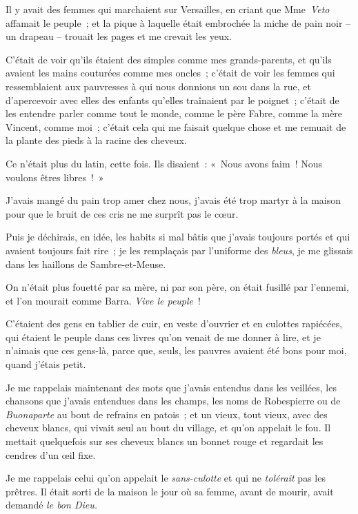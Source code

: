 \documentclass[french,twoside]{book} %
\begin{document}
Il y avait des femmes qui marchaient sur Versailles, en criant que Mme \emph{Veto} affamait le peuple ; et la pique à laquelle était embrochée la miche de pain noir – un drapeau – trouait les pages et me crevait les yeux.\par
C’était de voir qu’ils étaient des simples comme mes grands-parents, et qu’ils avaient les mains couturées comme mes oncles ; c’était de voir les femmes qui ressemblaient aux pauvresses à qui nous donnions un sou dans la rue, et d’apercevoir avec elles des enfants qu’elles traînaient par le poignet ; c’était de les entendre parler comme tout le monde, comme le père Fabre, comme la mère Vincent, comme moi ; c’était cela qui me faisait quelque chose et me remuait de la plante des pieds à la racine des cheveux.\par
Ce n’était plus du latin, cette fois. Ils disaient : « Nous avons faim ! Nous voulons êtres libres ! »\par
J’avais mangé du pain trop amer chez nous, j’avais été trop martyr à la maison pour que le bruit de ces cris ne me surprît pas le cœur.\par
Puis je déchirais, en idée, les habits si mal bâtis que j’avais toujours portés et qui avaient toujours fait rire ; je les remplaçais par l’uniforme des \emph{bleus}, je me glissais dans les haillons de Sambre-et-Meuse.\par
On n’était plus fouetté par sa mère, ni par son père, on était fusillé par l’ennemi, et l’on mourait comme Barra. \emph{Vive le peuple} !\par
C’étaient des gens en tablier de cuir, en veste d’ouvrier et en culottes rapiécées, qui étaient le peuple dans ces livres qu’on venait de me donner à lire, et je n’aimais que ces gens-là, parce que, seuls, les pauvres avaient été bons pour moi, quand j’étais petit.\par
\bigbreak
\noindent Je me rappelais maintenant des mots que j’avais entendus dans les veillées, les chansons que j’avais entendues dans les champs, les noms de Robespierre ou de \emph{Buonaparte} au bout de refrains en patois ; et un vieux, tout vieux, avec des cheveux blancs, qui vivait seul au bout du village, et qu’on appelait le fou. Il mettait quelquefois sur ses cheveux blancs un bonnet rouge et regardait les cendres d’un œil fixe.\par
Je me rappelais celui qu’on appelait le\emph{ sans-culotte} et qui ne \emph{tolérait} pas les prêtres. Il était sorti de la maison le jour où sa femme, avant de mourir, avait demandé\emph{ le bon Dieu.}\par
\end{document}
